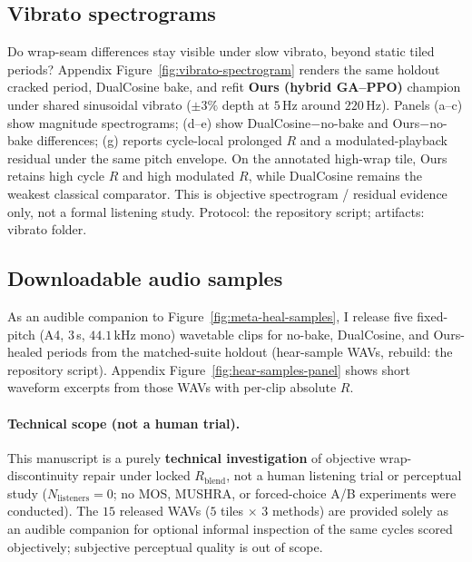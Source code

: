 
\subsection{Vibrato spectrograms}
\label{sec:vibrato-eval}

Do wrap-seam differences stay visible under slow vibrato, beyond static tiled periods?
Appendix Figure~\ref{fig:vibrato-spectrogram} renders the same holdout cracked period, DualCosine bake, and refit \textbf{Ours (hybrid GA--PPO)} champion under shared sinusoidal vibrato ($\pm 3\%$ depth at $5$\,Hz around $220$\,Hz).
Panels (a--c) show magnitude spectrograms; (d--e) show DualCosine$-$no-bake and Ours$-$no-bake differences; (g) reports cycle-local prolonged $R$ and a modulated-playback residual under the same pitch envelope.
On the annotated high-wrap tile, Ours retains high cycle $R$ and high modulated $R$, while DualCosine remains the weakest classical comparator.
This is objective spectrogram / residual evidence only, not a formal listening study.
Protocol:
the repository script;
artifacts:
vibrato folder.

\subsection{Downloadable audio samples}
\label{sec:hear-samples}

As an audible companion to Figure~\ref{fig:meta-heal-samples}, I release five fixed-pitch (A4, $3$\,s, $44.1$\,kHz mono) wavetable clips for no-bake, DualCosine, and Ours-healed periods from the matched-suite holdout
(hear-sample WAVs,
rebuild:
the repository script).
Appendix Figure~\ref{fig:hear-samples-panel} shows short waveform excerpts from those WAVs with per-clip absolute $R$.

\paragraph{Technical scope (not a human trial).}
This manuscript is a purely \textbf{technical investigation} of objective wrap-discontinuity repair under locked $R_{\mathrm{blend}}$, not a human listening trial or perceptual study ($N_{\mathrm{listeners}}{=}0$; no MOS, MUSHRA, or forced-choice A/B experiments were conducted).
The $15$ released WAVs ($5$ tiles $\times$ $3$ methods) are provided solely as an audible companion for optional informal inspection of the same cycles scored objectively; subjective perceptual quality is out of scope.


